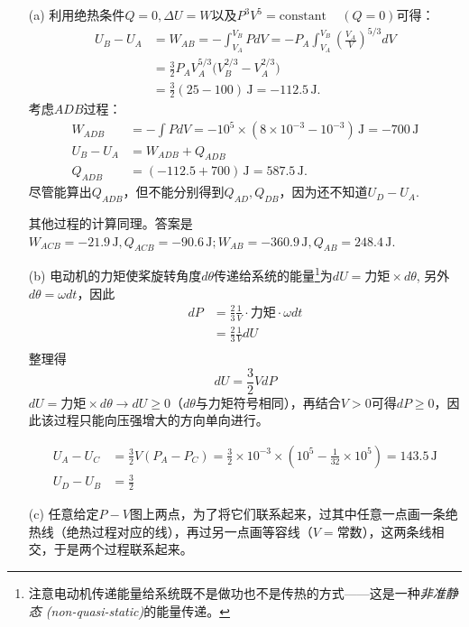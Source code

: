 \begin{enumerate}
	\item[(a)] 
		利用绝热条件$Q = 0, \Delta U = W$以及$P^3 V^5 = \mathrm{constant}\, \quad (Q = 0)$可得：
	\begin{align*}
		U_B - U_A &= W_{AB} = -\int_{V_A}^{V_B} PdV = -P_A \int_{V_A}^{V_B} \left( \frac{V_A}{V} \right)^{5/3} dV \\
		&= \frac{3}{2} P_A V_A^{5/3} \big( V_B^{2/3} - V_A^{2/3} \big) \\
		&= \frac{3}{2} (25 - 100) \,\mathrm{J} = -112.5\, \mathrm{J}.
	\end{align*}
		考虑$ADB$过程：
		\begin{align*}
			W_{ADB} &= -\int PdV = -10^5 \times (8 \times 10^{-3} - 10^{-3}) \,\mathrm{J} = -700 \,\mathrm{J} \\
			U_B - U_A &= W_{ADB} + Q_{ADB} \\
			Q_{ADB} &= (-112.5 + 700) \,\mathrm{J} = 587.5 \,\mathrm{J}.
		\end{align*}
		尽管能算出$Q_{ADB}$，但不能分别得到$Q_{AD}, Q_{DB}$，因为还不知道$U_D - U_A$.

		其他过程的计算同理。答案是$W_{ACB} = -21.9 \,\mathrm{J}, Q_{ACB} = -90.6 \,\mathrm{J}; W_{AB} = -360.9 \,\mathrm{J}, Q_{AB} = 248.4 \,\mathrm{J}$.
	\item[(b)] 
		电动机的力矩使桨旋转角度$d\theta$传递给系统的能量\footnote{注意电动机传递能量给系统既不是做功也不是传热的方式——这是一种{\it 非准静态 (non-quasi-static)}的能量传递。 }为$dU = \text{力矩} \times d\theta$, 另外$d\theta = \omega dt$，因此
		\begin{align*}
			dP &= \frac{2}{3} \frac{1}{V} \cdot \text{力矩} \cdot \omega dt \\
			&= \frac{2}{3} \frac{1}{V} dU \\
		\end{align*}
		整理得
		\[
			dU = \frac{3}{2} VdP
		\]
		$dU = \text{力矩} \times d\theta \to dU \geq 0$（$d\theta$与力矩符号相同），再结合$V > 0$可得$dP \geq 0$，因此该过程只能向压强增大的方向单向进行。

		\begin{align*}
			U_A - U_C &= \frac{3}{2} V (P_A - P_C) = \frac{3}{2} \times 10^{-3} \times \left( 10^5 - \frac{1}{32} \times 10^5 \right) = 143.5 \,\mathrm{J} \\
			U_D - U_B &= \frac{3}{2}
		\end{align*}
	\item[(c)]
		任意给定$P-V$图上两点，为了将它们联系起来，过其中任意一点画一条绝热线（绝热过程对应的线），再过另一点画等容线（$V = \text{常数}$），这两条线相交，于是两个过程联系起来。


\end{enumerate}
